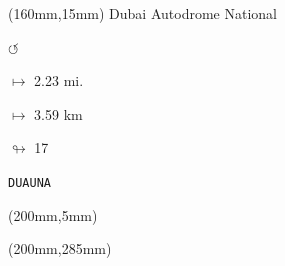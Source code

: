 \begin{textblock*}{40mm}(160mm,15mm)%
Dubai Autodrome National
\par \Huge$\circlearrowleft$
\Large
\par$\mapsto$ 2.23 mi.
\par$\mapsto$ 3.59 km
\par$\looparrowright$ 17
\par\hfill\tiny\tt DUAUNA\\
\end{textblock*}
\begin{textblock*}{20mm}(200mm,5mm)%
\fbox{\thepage}
\end{textblock*}
\begin{textblock*}{20mm}(200mm,285mm)%
\fbox{\thepage}
\end{textblock*}
\null\newpage

